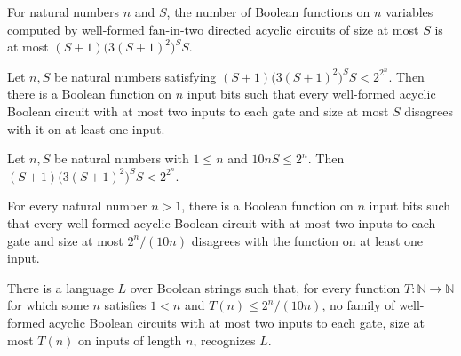 \begin{theorem}
\label{BoolCircuit.card_computable_dag_le}
\leanok
{}
For natural numbers $n$ and $S$, the number of Boolean functions on $n$ variables
computed by well-formed fan-in-two directed acyclic circuits of size at most $S$ is at
most $(S+1)\bigl(3(S+1)^2\bigr)^S S$.
\end{theorem}

\begin{theorem}
\label{BoolCircuit.exists_not_eval_dag_of_lt}
\leanok
{}
Let $n,S$ be natural numbers satisfying $(S+1)\bigl(3(S+1)^2\bigr)^S S<2^{2^n}$. Then
there is a Boolean function on $n$ input bits such that every well-formed acyclic
Boolean circuit with at most two inputs to each gate and size at most $S$ disagrees with
it on at least one input.
\end{theorem}

\begin{theorem}
\label{BoolCircuit.count_lt}
\leanok
{}
Let $n,S$ be natural numbers with $1 \le n$ and $10nS \le 2^n$. Then
$(S+1)\bigl(3(S+1)^2\bigr)^S S < 2^{2^n}$.
\end{theorem}

\begin{theorem}
\label{BoolCircuit.exists_hard_function_dag}
\leanok
{}
For every natural number $n>1$, there is a Boolean function on $n$ input bits such that
every well-formed acyclic Boolean circuit with at most two inputs to each gate and size
at most $2^n/(10n)$ disagrees with the function on at least one input.
\end{theorem}

\begin{theorem}
\label{BoolCircuit.exists_language_hard_dag}
\leanok
{}
There is a language $L$ over Boolean strings such that, for every function
$T\colon\mathbb{N}\to\mathbb{N}$ for which some $n$ satisfies $1<n$ and $T(n)\le
2^n/(10n)$, no family of well-formed acyclic Boolean circuits with at most two inputs to
each gate, size at most $T(n)$ on inputs of length $n$, recognizes $L$.
\end{theorem}

